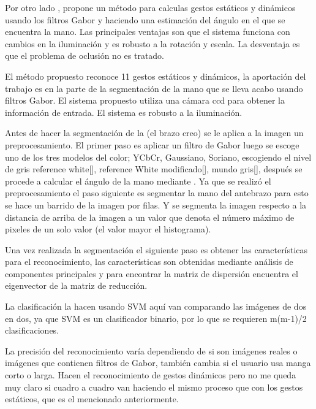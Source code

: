 
Por otro lado \citep{Huang2011}, propone un método para calculas gestos estáticos y dinámicos usando los filtros Gabor y haciendo una estimación del \'angulo en el que se encuentra la mano. Las principales ventajas son que el sistema funciona con cambios en la iluminaci\'on y es robusto a la rotaci\'on y escala. La desventaja es que el problema de oclusi\'on no es tratado.

El método propuesto reconoce 11 gestos estáticos y dinámicos,  la aportación del trabajo es en la parte de la segmentación de la mano que se lleva acabo usando filtros Gabor. El sistema propuesto utiliza una cámara ccd para obtener la información de entrada. El sistema es robusto a la iluminación. 
 
Antes de hacer la segmentación de la (el brazo creo) se le aplica a la imagen un preprocesamiento. El primer paso es aplicar un filtro de Gabor luego  se escoge uno de los tres modelos del color; YCbCr, Gaussiano, Soriano, escogiendo el nivel de gris reference white[], reference White modificado[], mundo gris[], después se procede a calcular el ángulo de la mano mediante .  
Ya que se realizó el preprocesamiento el paso siguiente es segmentar la mano del antebrazo para esto se hace un barrido de la imagen por filas. Y se segmenta la imagen respecto a la distancia de arriba de la imagen a un valor que denota el número máximo de pixeles de un solo valor (el valor mayor el histograma).

Una vez realizada la segmentación el siguiente paso es obtener las características para el reconocimiento, las características son obtenidas mediante análisis de componentes principales y para encontrar la matriz de dispersión encuentra el eigenvector de la matriz de reducción. 

La clasificación la hacen usando SVM aquí van comparando las imágenes de dos en dos, ya que SVM es un clasificador binario, por lo que se requieren m(m-1)/2 clasificaciones.   

La precisión del reconocimiento varía dependiendo de si son imágenes reales o imágenes que contienen filtros de Gabor, también cambia si el usuario usa manga corto o larga. Hacen el reconocimiento de gestos dinámicos pero no me queda muy claro si cuadro a cuadro van haciendo el mismo proceso que con los gestos estáticos, que es el mencionado anteriormente.  


